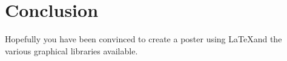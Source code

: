 \section*{Conclusion}
Hopefully you have been convinced to create a poster using \LaTeX and the various graphical libraries available.